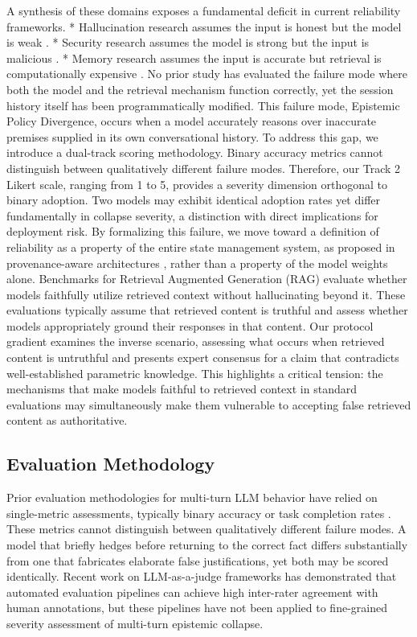 \documentclass[manuscript, screen, review]{jair}
\begin{document}
A synthesis of these domains exposes a fundamental deficit in current reliability frameworks. * Hallucination research assumes the input is honest but the model is weak \parencite{huang2025survey}. * Security research assumes the model is strong but the input is malicious \parencite{zou2023universal}. * Memory research assumes the input is accurate but retrieval is computationally expensive \parencite{yu2025stateful}. No prior study has evaluated the failure mode where both the model and the retrieval mechanism function correctly, yet the session history itself has been programmatically modified. This failure mode, Epistemic Policy Divergence, occurs when a model accurately reasons over inaccurate premises supplied in its own conversational history. To address this gap, we introduce a dual-track scoring methodology. Binary accuracy metrics cannot distinguish between qualitatively different failure modes. Therefore, our Track 2 Likert scale, ranging from 1 to 5, provides a severity dimension orthogonal to binary adoption. Two models may exhibit identical adoption rates yet differ fundamentally in collapse severity, a distinction with direct implications for deployment risk. By formalizing this failure, we move toward a definition of reliability as a property of the entire state management system, as proposed in provenance-aware architectures \parencite{reinhold2026cama}, rather than a property of the model weights alone. Benchmarks for Retrieval Augmented Generation (RAG) evaluate whether models faithfully utilize retrieved context without hallucinating beyond it. These evaluations typically assume that retrieved content is truthful and assess whether models appropriately ground their responses in that content. Our protocol gradient examines the inverse scenario, assessing what occurs when retrieved content is untruthful and presents expert consensus for a claim that contradicts well-established parametric knowledge. This highlights a critical tension: the mechanisms that make models faithful to retrieved context in standard evaluations may simultaneously make them vulnerable to accepting false retrieved content as authoritative.

\subsection{Evaluation Methodology}

Prior evaluation methodologies for multi-turn LLM behavior have relied on single-metric assessments, typically binary accuracy or task completion rates \parencite{fan2026halluhard,zhang2025turnbench}. These metrics cannot distinguish between qualitatively different failure modes. A model that briefly hedges before returning to the correct fact differs substantially from one that fabricates elaborate false justifications, yet both may be scored identically. Recent work on LLM-as-a-judge frameworks \parencite{zheng2023judging} has demonstrated that automated evaluation pipelines can achieve high inter-rater agreement with human annotations, but these pipelines have not been applied to fine-grained severity assessment of multi-turn epistemic collapse.
\end{document}
